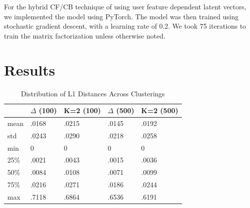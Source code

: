 \documentclass{article}
\begin{document}
For the hybrid CF/CB technique of using user feature dependent latent vectors, we implemented the model using PyTorch. The model was then trained using stochastic gradient descent, with a learning rate of 0.2. We took 75 iterations to train the matrix factorization unless otherwise noted. 

\section{Results}



\begin{table}[t]
\centering
\caption{Distribution of L1 Distances Across Clusterings}
\label{fig:dist}
\begin{tabular}{lllll}
     & $\Delta$ (100) &K=2 (100) & $\Delta$ (500)  & K=2 (500)\\ \hline
\multicolumn{1}{l|}{mean} & .0168         & .0215   & .0145         & .0192   \\
\multicolumn{1}{l|}{std}  & .0243         & .0290   & .0218         & .0258   \\
\multicolumn{1}{l|}{min}  & 0             & 0       & 0             & 0       \\
\multicolumn{1}{l|}{25\%} & .0021         & .0043   & .0015         & .0036   \\
\multicolumn{1}{l|}{50\%} & .0084         & .0108   & .0071         & .0099   \\
\multicolumn{1}{l|}{75\%} & .0216         & .0271   & .0186         & .0244   \\
\multicolumn{1}{l|}{max}  & .7118         & .6864   & .6536         & .6191  
\end{tabular}
\end{table}
\end{document}
